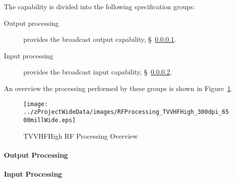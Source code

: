 The \ThisSys \ThisSegment \TVVHFHigh capability is divided into the following specification groups:
\begin{description}
	\item[Output processing] provides the \TVVHFHigh broadcast output capability, \S~\ref{loc:RF_TVVHFHigh_Output}.
	\item[Input processing]  provides the \TVVHFHigh broadcast input  capability, \S~\ref{loc:RF_TVVHFHigh_Input}.
\end{description}
An overview the processing performed by these groups is shown in Figure~\ref{fig:TVVHFHigh_RF_Processing}.
\begin{figure}[htbp]
	\centering
		\texttt{[image: ../zProjectWideData/images/RFProcessing\_TVVHFHigh\_300dpi\_6500millWide.eps]}
	\caption[TVVHFHigh RF Processing Overview]{TVVHFHigh RF Processing Overview}
	\label{fig:TVVHFHigh_RF_Processing}
\end{figure}

\KNEADPARAGRAPHNEWPAGE
\paragraph{\TVVHFHigh \RF Output Processing}
\label{loc:RF_TVVHFHigh_Output}
\renewcommand{\ThisSubSegment}{\TVVHFHigh \RF Output Processing\xspace}%


\KNEADPARAGRAPHNEWPAGE
\paragraph{\TVVHFHigh \RF Input Processing}
\label{loc:RF_TVVHFHigh_Input}
\renewcommand{\ThisSubSegment}{\TVVHFHigh \RF Input Processing\xspace}%

